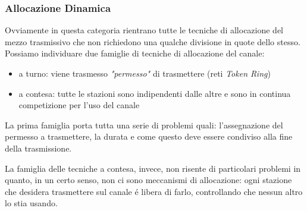 \documentclass[12pt]{article}
\begin{document}
\subsubsection{Allocazione Dinamica} \label{mac-allorazione-canale-dinamica}
Ovviamente in questa categoria rientrano tutte le tecniche di allocazione del mezzo trasmissivo che non richiedono una 
qualche divisione in quote dello stesso. Possiamo individuare due famiglie di tecniche di allocazione del canale:
\begin{itemize}[noitemsep]
	\item a turno:  viene trasmesso \textit{"permesso"} di trasmettere (reti \textit{Token Ring})
	\item a contesa: tutte le stazioni sono indipendenti dalle altre e sono in continua competizione per l'uso del 
		  canale
\end{itemize}
La prima famiglia porta tutta una serie di problemi quali: l'assegnazione del permesso a trasmettere, la durata e come questo 
deve essere condiviso alla fine della trasmissione.

La famiglia delle tecniche a contesa, invece, non risente di particolari problemi in quanto, in un certo senso, non ci sono
meccanismi di allocazione: ogni stazione che desidera trasmettere sul canale \'e libera di farlo, controllando che nessun 
altro lo stia usando.

\clearpage
\end{document}
